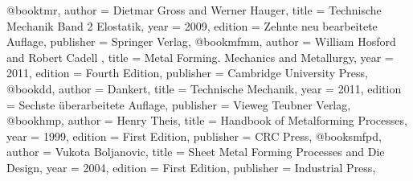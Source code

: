 @book{tmr,
author = {Dietmar Gross and Werner Hauger},
title = {Technische Mechanik Band 2 Elostatik},
year = {2009},
edition = {Zehnte neu bearbeitete Auflage},
publisher = {Springer Verlag},
}
@book{mfmm,
author = {William Hosford and Robert Cadell },
title = {Metal Forming. Mechanics and Metallurgy},
year = {2011},
edition = {Fourth Edition},
publisher = {Cambridge University Press},
}
@book{dd,
author = {Dankert},
title = {Technische Mechanik},
year = {2011},
edition = {Sechste überarbeitete Auflage},
publisher = {Vieweg Teubner Verlag},
}
@book{hmp,
author = {Henry Theis},
title = {Handbook of Metalforming Processes},
year = {1999},
edition = {First Edition},
publisher = {CRC Press},
}
@book{smfpd,
author = {Vukota Boljanovic},
title = {Sheet Metal Forming Processes and Die Design},
year = {2004},
edition = {First Edition},
publisher = {Industrial Press},
}





















